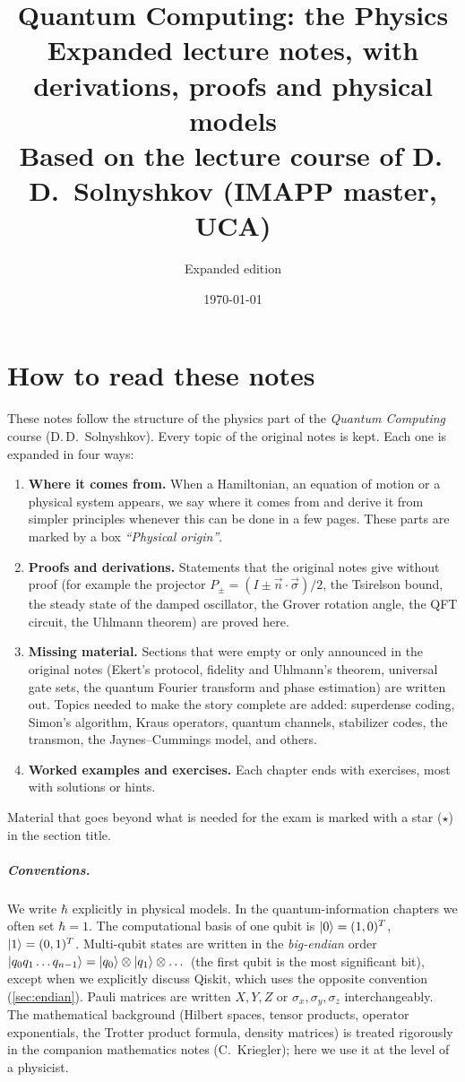 \documentclass[11pt,a4paper,openany]{book}
\title{\textbf{Quantum Computing: the Physics}\\[0.6em]
\large Expanded lecture notes, with derivations, proofs and physical models\\[0.3em]
\normalsize Based on the lecture course of D.\,D.~Solnyshkov (IMAPP master, UCA)}
\author{Expanded edition}
\date{\today}
\begin{document}
\frontmatter
\maketitle

\chapter*{How to read these notes}
These notes follow the structure of the physics part of the \emph{Quantum Computing} course
(D.\,D.~Solnyshkov). Every topic of the original notes is kept. Each one is expanded in four ways:
\begin{enumerate}
  \item \textbf{Where it comes from.} When a Hamiltonian, an equation of motion or a physical system appears,
  we say where it comes from and derive it from simpler principles whenever this can be done in a few pages.
  These parts are marked by a box \emph{``Physical origin''}.
  \item \textbf{Proofs and derivations.} Statements that the original notes give without proof
  (for example the projector $P_\pm=(I\pm\vec n\cdot\vec\sigma)/2$, the Tsirelson bound, the steady state of the
  damped oscillator, the Grover rotation angle, the QFT circuit, the Uhlmann theorem) are proved here.
  \item \textbf{Missing material.} Sections that were empty or only announced in the original notes
  (Ekert's protocol, fidelity and Uhlmann's theorem, universal gate sets, the quantum Fourier transform
  and phase estimation) are written out. Topics needed to make the story complete are added:
  superdense coding, Simon's algorithm, Kraus operators, quantum channels, stabilizer codes, the
  transmon, the Jaynes--Cummings model, and others.
  \item \textbf{Worked examples and exercises.} Each chapter ends with exercises, most with solutions or hints.
\end{enumerate}
Material that goes beyond what is needed for the exam is marked with a star ($\star$) in the section title.

\paragraph{Conventions.}
We write $\hbar$ explicitly in physical models. In the quantum-information chapters we often set $\hbar=1$.
The computational basis of one qubit is $\left|0\right\rangle=(1,0)^T$, $\left|1\right\rangle=(0,1)^T$. Multi-qubit states are written in
the \emph{big-endian} order $\left|q_0q_1\dots q_{n-1}\right\rangle=\left|q_0\right\rangle\otimes\left|q_1\right\rangle\otimes\dots$ (the first qubit is the most significant bit),
except when we explicitly discuss Qiskit, which uses the opposite convention (\cref{sec:endian}).
Pauli matrices are written $X,Y,Z$ or $\sigma_x,\sigma_y,\sigma_z$ interchangeably.
The mathematical background (Hilbert spaces, tensor products, operator exponentials, the Trotter product formula,
density matrices) is treated rigorously in the companion mathematics notes (C.~Kriegler); here we use
it at the level of a physicist.
\end{document}
